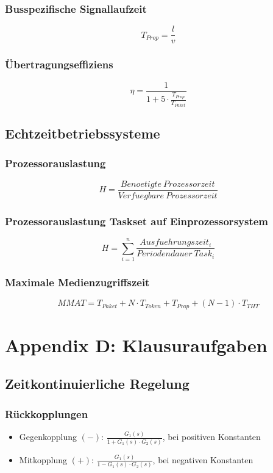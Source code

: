 \subsubsection{Busspezifische Signallaufzeit}
\[T_{Prop} = \frac{l}{v}\]

\subsubsection{Übertragungseffiziens}
\[\eta = \frac{1}{1+5\cdot\frac{T_{Prop}}{T_{Paket}}}\]


\subsection{Echtzeitbetriebssysteme}

\subsubsection{Prozessorauslastung}
\[H = \frac{Benoetigte~Prozessorzeit}{Verfuegbare~Prozessorzeit}\]

\subsubsection{Prozessorauslastung Taskset auf Einprozessorsystem}
\[H = \sum_{i=1}^{n}\frac{Ausfuehrungszeit_i}{Periodendauer~Task_i}\]

\subsubsection{Maximale Medienzugriffszeit}
\[MMAT = T_{Paket} + N \cdot T_{Token} + T_{Prop} + (N-1) \cdot T_{THT}\]


\section{Appendix D: Klausuraufgaben}

\subsection{Zeitkontinuierliche Regelung}

\subsubsection{Rückkopplungen}
\begin{itemize}
	\item Gegenkopplung \((-)\): \(\frac{G_1(s)}{1 + G_1(s) \cdot G_2(s)}\), bei positiven Konstanten
	\item Mitkopplung \((+)\): \(\frac{G_1(s)}{1-G_1(s) \cdot G_2(s)}\), bei negativen Konstanten
\end{itemize}

